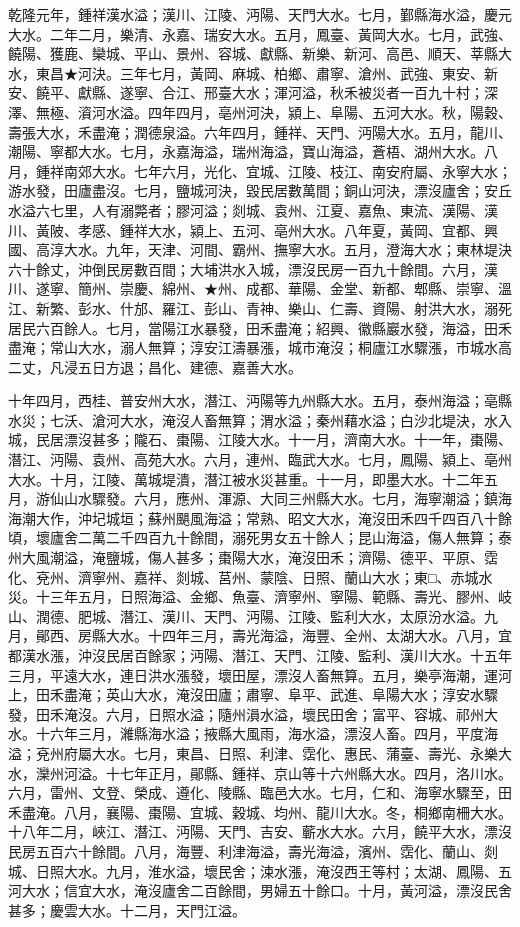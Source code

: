 \begin{pinyinscope}
乾隆元年，鍾祥漢水溢；漢川、江陵、沔陽、天門大水。七月，鄞縣海水溢，慶元大水。二年二月，樂清、永嘉、瑞安大水。五月，鳳臺、黃岡大水。七月，武強、饒陽、獲鹿、欒城、平山、景州、容城、獻縣、新樂、新河、高邑、順天、莘縣大水，東昌★河決。三年七月，黃岡、麻城、柏鄉、肅寧、滄州、武強、東安、新安、饒平、獻縣、遂寧、合江、邢臺大水；渾河溢，秋禾被災者一百九十村；深澤、無極、澬河水溢。四年四月，亳州河決，潁上、阜陽、五河大水。秋，陽穀、壽張大水，禾盡淹；潤德泉溢。六年四月，鍾祥、天門、沔陽大水。五月，龍川、潮陽、寧都大水。七月，永嘉海溢，瑞州海溢，寶山海溢，蒼梧、湖州大水。八月，鍾祥南郊大水。七年六月，光化、宜城、江陵、枝江、南安府屬、永寧大水；游水發，田廬盡沒。七月，鹽城河決，毀民居數萬間；銅山河決，漂沒廬舍；安丘水溢六七里，人有溺斃者；膠河溢；剡城、袁州、江夏、嘉魚、東流、漢陽、漢川、黃陂、孝感、鍾祥大水，潁上、五河、亳州大水。八年夏，黃岡、宜都、興國、高淳大水。九年，天津、河間、霸州、撫寧大水。五月，澄海大水；東林堤決六十餘丈，沖倒民房數百間；大埔洪水入城，漂沒民房一百九十餘間。六月，漢川、遂寧、簡州、崇慶、綿州、★州、成都、華陽、金堂、新都、郫縣、崇寧、溫江、新繁、彭水、什邡、羅江、彭山、青神、樂山、仁壽、資陽、射洪大水，溺死居民六百餘人。七月，當陽江水暴發，田禾盡淹；紹興、徽縣巖水發，海溢，田禾盡淹；常山大水，溺人無算；淳安江濤暴漲，城市淹沒；桐廬江水驟漲，市城水高二丈，凡浸五日方退；昌化、建德、嘉善大水。

十年四月，西桂、普安州大水，潛江、沔陽等九州縣大水。五月，泰州海溢；亳縣水災；七沃、滄河大水，淹沒人畜無算；渭水溢；秦州藉水溢；白沙北堤決，水入城，民居漂沒甚多；隴石、棗陽、江陵大水。十一月，濟南大水。十一年，棗陽、潛江、沔陽、袁州、高苑大水。六月，連州、臨武大水。七月，鳳陽、潁上、亳州大水。十月，江陵、萬城堤潰，潛江被水災甚重。十一月，即墨大水。十二年五月，游仙山水驟發。六月，應州、渾源、大同三州縣大水。七月，海寧潮溢；鎮海海潮大作，沖圮城垣；蘇州颶風海溢；常熟、昭文大水，淹沒田禾四千四百八十餘頃，壞廬舍二萬二千四百九十餘間，溺死男女五十餘人；昆山海溢，傷人無算；泰州大風潮溢，淹鹽城，傷人甚多；棗陽大水，淹沒田禾；濟陽、德平、平原、霑化、兗州、濟寧州、嘉祥、剡城、莒州、蒙陰、日照、蘭山大水；東□、赤城水災。十三年五月，日照海溢、金鄉、魚臺、濟寧州、寧陽、範縣、壽光、膠州、岐山、潤德、肥城、潛江、漢川、天門、沔陽、江陵、監利大水，太原汾水溢。九月，鄖西、房縣大水。十四年三月，壽光海溢，海豐、全州、太湖大水。八月，宜都漢水漲，沖沒民居百餘家；沔陽、潛江、天門、江陵、監利、漢川大水。十五年三月，平遠大水，連日洪水漲發，壞田屋，漂沒人畜無算。五月，樂亭海潮，運河上，田禾盡淹；英山大水，淹沒田廬；肅寧、阜平、武進、阜陽大水；淳安水驟發，田禾淹沒。六月，日照水溢；隨州溳水溢，壞民田舍；富平、容城、祁州大水。十六年三月，濰縣海水溢；掖縣大風雨，海水溢，漂沒人畜。四月，平度海溢；兗州府屬大水。七月，東昌、日照、利津、霑化、惠民、蒲臺、壽光、永樂大水，灤州河溢。十七年正月，鄖縣、鍾祥、京山等十六州縣大水。四月，洛川水。六月，雷州、文登、榮成、遵化、陵縣、臨邑大水。七月，仁和、海寧水驟至，田禾盡淹。八月，襄陽、棗陽、宜城、穀城、均州、龍川大水。冬，桐鄉南柵大水。十八年二月，峽江、潛江、沔陽、天門、吉安、蘄水大水。六月，饒平大水，漂沒民房五百六十餘間。八月，海豐、利津海溢，壽光海溢，濱州、霑化、蘭山、剡城、日照大水。九月，淮水溢，壞民舍；涑水漲，淹沒西王等村；太湖、鳳陽、五河大水；信宜大水，淹沒廬舍二百餘間，男婦五十餘口。十月，黃河溢，漂沒民舍甚多；慶雲大水。十二月，天門江溢。


\end{pinyinscope}
